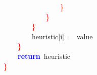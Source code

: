 \mbox{}\ \ \ \ \ \ \ \ \ \ \ \ \ \ \ \ \textcolor{Red}{\}} \\
\mbox{}\ \ \ \ \ \ \ \ \ \ \ \ \textcolor{Red}{\}} \\
\mbox{}\ \ \ \ \ \ \ \ \textcolor{Red}{\}} \\
\mbox{}\ \ \ \ \ \ \ \ heuristic\textcolor{BrickRed}{[}i\textcolor{BrickRed}{]}\ \textcolor{BrickRed}{=}\ value \\
\mbox{}\ \ \ \ \textcolor{Red}{\}} \\
\mbox{}\ \ \ \ \textbf{\textcolor{Blue}{return}}\ heuristic \\
\mbox{}\textcolor{Red}{\}} \\
\mbox{}

